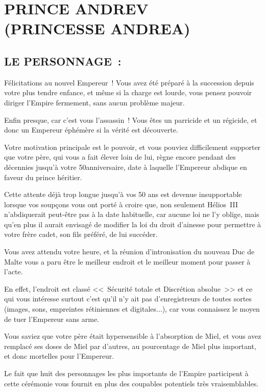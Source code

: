 \documentclass[14pt,twocolumn]{extarticle}
\begin{document}
\section{PRINCE ANDREV\\(PRINCESSE ANDREA)}

\subsection{LE PERSONNAGE~:}

Félicitations au nouvel Empereur~! Vous avez été préparé à la succession depuis
votre plus tendre enfance, et même si la charge est lourde, vous pensez pouvoir
diriger l'Empire fermement, sans aucun problème majeur.

Enfin presque, car c'est vous l'assassin~! Vous êtes un parricide et un
régicide, et donc un Empereur éphémère si la vérité est découverte.

Votre motivation principale est le pouvoir, et vous pouviez difficilement
supporter que votre père, qui vous a fait élever loin de lui, règne encore
pendant des décennies jusqu'à votre 50\ieme anniversaire, date à laquelle 
l'Empereur abdique en faveur du prince héritier.

Cette attente déjà trop longue jusqu'à vos 50 ans est devenue insupportable
lorsque vos soupçons vous ont porté à croire que, non seulement Hélios~III
n'abdiquerait peut-être pas à la date habituelle, car aucune loi ne l'y oblige,
mais qu'en plus il aurait envisagé de modifier la loi du droit d'ainesse pour
permettre à votre frère cadet, son fils préféré, de lui succéder.

Vous avez attendu votre heure, et la réunion d'intronisation du nouveau Duc de
Malte vous a paru être le meilleur endroit et le meilleur moment pour passer à
l'acte.

En effet, l'endroit est classé <<~Sécurité totale et Discrétion absolue~>> et
ce qui vous intéresse surtout c'est qu'il n'y ait pas d'enregistreurs de toutes
sortes (images, sons, empreintes rétiniennes et digitales...), car vous
connaissez le moyen de tuer l'Empereur sans arme.

Vous saviez que votre père était hypersensible à l'absorption de Miel, et vous
avez remplacé ses doses de Miel par d'autres, au pourcentage de Miel plus
important, et donc mortelles pour l'Empereur.

Le fait que huit des personnages les plus importants de l'Empire participent à
cette cérémonie vous fournit en plus des coupables potentiels très
vraisemblables.
\end{document}
